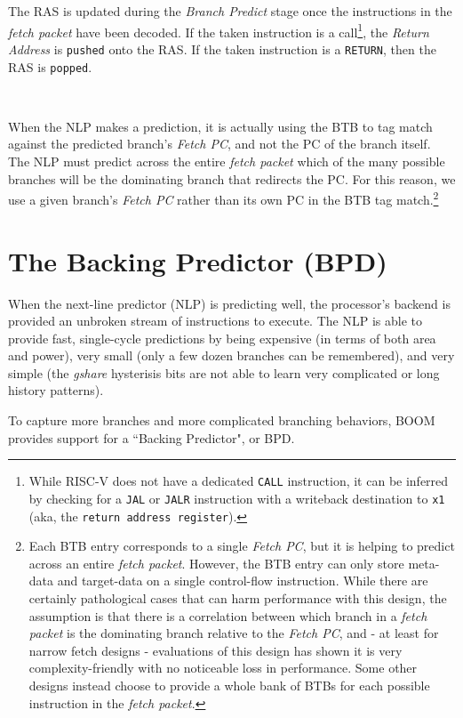 The RAS is updated during the {\em Branch Predict} stage once the instructions in the {\em fetch packet} have been decoded. If the taken instruction is a call\footnote{While RISC-V does not have a dedicated {\tt {CALL}} instruction, it can be inferred by checking for a {\tt {JAL}} or {\tt {JALR}} instruction with a writeback destination to {\tt {x1}} (aka, the {\tt {return address register}}).}, the {\em Return Address} is {\tt {pushed}} onto the RAS. If the taken instruction is a {\tt {RETURN}}, then the RAS is {\tt {popped}}.

\



When the NLP makes a prediction, it is actually using the BTB to tag match against the predicted branch's {\em Fetch PC}, and not the PC of the branch itself.  
The NLP must predict across the entire {\em fetch packet} which of the many possible branches will be the dominating branch that redirects the PC.
For this reason, we use a given branch's {\em Fetch PC} rather than its own PC in the BTB tag match.\footnote{Each BTB entry corresponds to a single {\em Fetch PC}, but it is helping to predict across an entire {\em fetch packet}. However, the BTB entry can only store meta-data and target-data on a single control-flow instruction.  While there are certainly pathological cases that can harm performance with this design, the assumption is that there is a correlation between which branch in a {\em fetch packet} is the dominating branch relative to the {\em Fetch PC}, and - at least for narrow fetch designs - evaluations of this design has shown it is very complexity-friendly with no noticeable loss in performance. Some other designs instead choose to provide a whole bank of BTBs for each possible instruction in the {\em fetch packet}.} 

\section{The Backing Predictor (BPD)}

When the next-line predictor (NLP) is predicting well, the processor's backend is provided an unbroken stream of instructions to execute. The NLP is able to provide fast, single-cycle predictions by being expensive (in terms of both area and power), very small (only a few dozen branches can be remembered), and very simple (the {\em gshare} hysterisis bits are not able to learn very complicated or long history patterns).

To capture more branches and more complicated branching behaviors, BOOM provides support for a ``Backing Predictor", or BPD. 

